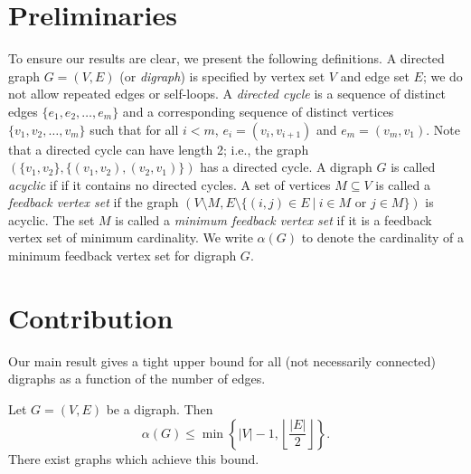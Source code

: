 \documentclass[CRMATH,Unicode,manuscript]{cedram}
\begin{document}
\section{Preliminaries}
To ensure our results are clear, we present the following definitions.
A directed graph $G=(V,E)$ (or \emph{digraph}) is specified by vertex set $V$ and edge set $E$; we do not allow repeated edges or self-loops.
A \emph{directed cycle} is a sequence of distinct edges $\{e_1,e_2,\ldots,e_m\}$ and a corresponding sequence of distinct vertices $\{v_1,v_2,\ldots,v_m\}$ such that for all $i<m$, $e_i=(v_i,v_{i+1})$ and $e_m=(v_m,v_1)$.
Note that a directed cycle can have length 2; i.e., the graph $(\{v_1,v_2\},\{(v_1,v_2),(v_2,v_1)\})$ has a directed cycle.
A digraph $G$ is called \emph{acyclic} if if it contains no directed cycles.
A set of vertices $M\subseteq V$ is called a \emph{feedback vertex set} if the graph $\left(V\setminus M,E\setminus \{(i,j)\in E\ |\ i\in M \mbox{ or } j\in M\}\right)$ is acyclic.
The set $M$ is called a \emph{minimum feedback vertex set} if it is a feedback vertex set of minimum cardinality. 
We write $\alpha(G)$ to denote the cardinality of a minimum feedback vertex set for digraph $G$.

\section{Contribution}


Our main result gives a tight upper bound for all (not necessarily connected) digraphs as a function of the number of edges.
\begin{theo}\label{thm:main}
Let $G=(V,E)$ be a digraph.
Then
\begin{equation}\label{eq:main}
\alpha(G) \leq \min\left\{|V|-1,\left\lfloor\frac{|E|}{2}\right\rfloor\right\}.
\end{equation}
There exist graphs which achieve this bound.
\end{theo}
\end{document}
